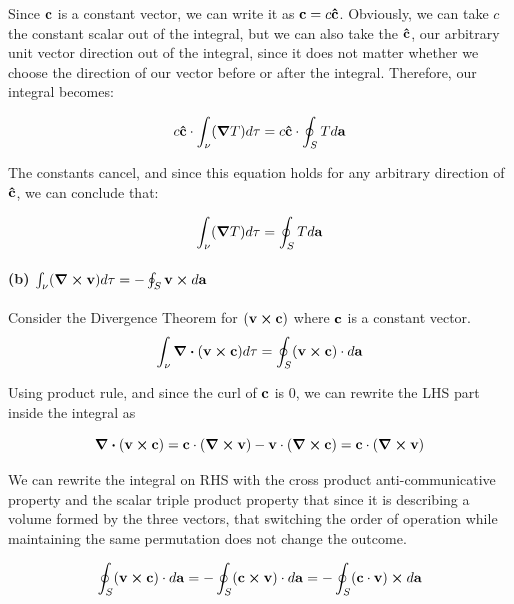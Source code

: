\documentclass{article}
\numberwithin{equation}{section}
\newcommand{\vbh}[1]{\vb{\hat{#1}}}
\begin{document}
Since $\vb{c}$ is a constant vector, we can write it as $\vb{c} = c \vbh{c}$. Obviously, we can take $c$ the constant scalar out of the integral, but we can also take the $\vbh{c}$, our arbitrary unit vector direction out of the integral, since it does not matter whether we choose the direction of our vector before or after the integral. Therefore, our integral becomes:

\begin{equation}
    c \vbh{c} \cdot \int_\nu (\grad T) d \tau = c \vbh{c} \cdot \oint_S T d \vb{a}
\end{equation}

The constants cancel, and since this equation holds for any arbitrary direction of $\vbh{c}$, we can conclude that:

\begin{equation}
    \int_\nu (\grad T) d \tau =\oint_S T d \vb{a}
\end{equation}

\paragraph{(b) $\int_\nu (\curl \vb{v}) d \tau = - \oint_S \vb{v} \cross d \vb{a}$ \\}

Consider the Divergence Theorem for $(\vb{v \cross c)}$ where $\vb{c}$ is a constant vector.
\begin{equation}
    \int_\nu \div (\vb{v \cross c}) d \tau =\oint_S (\vb{v \cross c}) \cdot d \vb{a}
\end{equation}

Using product rule, and since the curl of $\vb{c}$ is 0, we can rewrite the LHS part inside the integral as

\begin{equation}
    \div (\vb{v \cross c}) = \vb{c \cdot (\curl v) - v \cdot (\curl c)} = \vb{c \cdot (\curl v) }
\end{equation}

We can rewrite the integral on RHS with the cross product anti-communicative property and the scalar triple product property that since it is describing a volume formed by the three vectors, that switching the order of operation while maintaining the same permutation does not change the outcome.

\begin{equation}
    \oint_S (\vb{v \cross c}) \cdot d \vb{a} = - \oint_S (\vb{c \cross v}) \cdot d \vb{a} = - \oint_S (\vb{c \cdot v}) \cross d \vb{a}
\end{equation}
\end{document}
